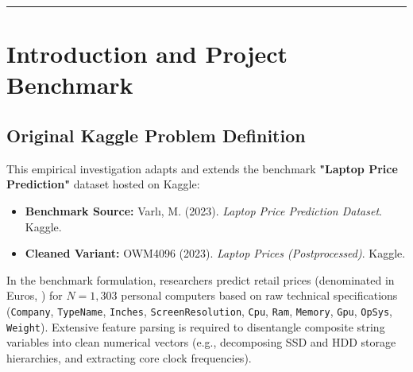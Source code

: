 \documentclass[11pt, a4paper]{article}
\begin{document}
\tableofcontents
\vspace{1cm}
\hrule
\vspace{1cm}

\section{Introduction and Project Benchmark}

\subsection{Original Kaggle Problem Definition}
This empirical investigation adapts and extends the benchmark \textbf{"Laptop Price Prediction"} dataset hosted on Kaggle:
\begin{itemize}
    \item \textbf{Benchmark Source:} Varlı, M. (2023). \textit{Laptop Price Prediction Dataset}. Kaggle.
    \item \textbf{Cleaned Variant:} OWM4096 (2023). \textit{Laptop Prices (Postprocessed)}. Kaggle.
\end{itemize}

In the benchmark formulation, researchers predict retail prices (denominated in Euros, \texteuro) for $N = 1,303$ personal computers based on raw technical specifications (\texttt{Company}, \texttt{TypeName}, \texttt{Inches}, \texttt{ScreenResolution}, \texttt{Cpu}, \texttt{Ram}, \texttt{Memory}, \texttt{Gpu}, \texttt{OpSys}, \texttt{Weight}). Extensive feature parsing is required to disentangle composite string variables into clean numerical vectors (e.g., decomposing SSD and HDD storage hierarchies, and extracting core clock frequencies).
\end{document}
